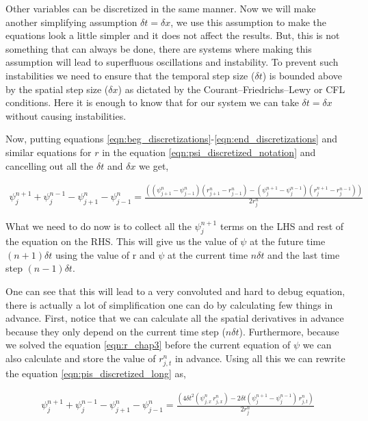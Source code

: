 Other variables can be discretized in the same manner. Now we will make another simplifying assumption $\delta t = \delta x$, we use this assumption to make the equations look a little simpler and it does not affect the results. But, this is not something that can always be done, there are systems where making this assumption will lead to  superfluous oscillations and instability. To prevent such instabilities we need to ensure that the temporal step size ($\delta t$) is bounded above by the spatial step size ($\delta x$) as dictated by the Courant–Friedrichs–Lewy or CFL conditions. Here it is enough to know that for our system we can take $\delta t = \delta x$ without causing instabilities.


Now, putting equations \ref{eqn:beg_discretizations}-\ref{eqn:end_discretizations} and similar equations for $r$ in the equation \ref{eqn:psi_discretized_notation} and cancelling out all the $\delta t$ and $\delta x$ we get,

\begin{multline}
    \psi^{n+1}_{j} + \psi^{n-1}_{j} - \psi^{n}_{j+1} - \psi^{n}_{j-1} = \frac{((\psi^{n}_{j+1} - \psi^{n}_{j-1})(r^{n}_{j+1} - r^{n}_{j-1}) - (\psi^{n+1}_{j} - \psi^{n-1}_{j})(r^{n+1}_{j} - r^{n-1}_{j}))}{2 r^n_j}
    \label{eqn:pis_discretized_long}
\end{multline}

What we need to do now is to collect all the $\psi^{n+1}_j$ terms on the LHS and rest of the equation on the RHS. This will give us the value of $\psi$ at the future time $(n+1) \delta t$ using the value of r and $\psi$ at the current time $n \delta t$ and the last time step $ (n-1) \delta t$.


One can see that this will lead to a very convoluted and hard to debug equation, there is actually a lot of simplification one can do by calculating few things in advance. First, notice that we can calculate all the spatial derivatives in advance because they only depend on the current time step ($n \delta t$). Furthermore, because we solved the equation \ref{eqn:r_chap3} before the current equation of $\psi$ we can also calculate and store the value of $r^n_{j,t}$ in advance. Using all this we can rewrite the equation \ref{eqn:pis_discretized_long} as,


\begin{multline}
    \psi^{n+1}_{j} + \psi^{n-1}_{j} - \psi^{n}_{j+1} - \psi^{n}_{j-1} = \frac{(4\delta t^2 (\psi^{n}_{j,x} \, r^{n}_{j,x}) - 2 \delta t(\psi^{n+1}_{j} - \psi^{n-1}_{j})\,r^{n}_{j,t})}{2 r^n_j}
    \label{eqn:final_psi}
\end{multline}

